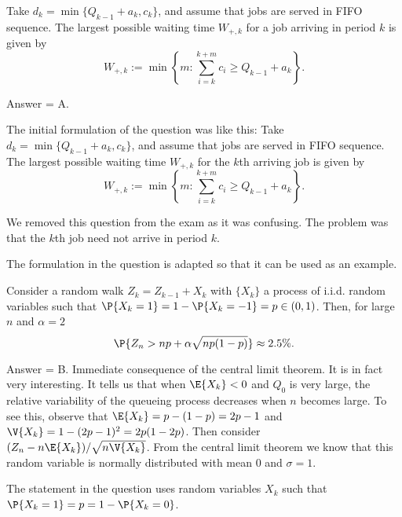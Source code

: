 \begin{exercise}[201902]
Take $d_k = \min\{Q_{k-1}+a_k, c_k\}$, and assume that jobs are served in
 FIFO sequence. The largest possible waiting time $W_{+, k}$ for a job arriving in period $k$ is given by 
 \begin{equation*}
 W_{+,k}:= \min\left\{m: \sum_{i=k}^{k+m} c_i \geq
 Q_{k-1}+a_k\right\}.
 \end{equation*}

\begin{solution}
Answer = A.



The initial formulation of the question was like this: Take $d_k = \min\{Q_{k-1}+a_k, c_k\}$, and assume that jobs are served in
 FIFO sequence. The largest possible waiting time $W_{+, k}$ for the $k$th arriving job is given by 
 \begin{equation*}
 W_{+,k}:= \min\left\{m: \sum_{i=k}^{k+m} c_i \geq
 Q_{k-1}+a_k\right\}.
 \end{equation*}

 We removed this question from the exam as it was confusing. The problem was that the $k$th job need not arrive in period $k$.

 The formulation in the question is adapted so that it can be used as an example. 

\end{solution}
\end{exercise}

\begin{exercise}[201902]
 Consider a random walk $Z_k = Z_{k-1} + X_k$ with $\{X_k\}$ a process of i.i.d. random variables such that $\P{X_k=1} = 1-\P{X_k=-1} = p \in (0, 1)$. Then, for large $n$ and $\alpha = 2$
 \begin{equation*}
 \P{Z_n > np + \alpha \sqrt{np(1-p)}} \approx 2.5\%.
 \end{equation*}


\begin{solution}
Answer = B. Immediate consequence of the central limit theorem. It is in fact very interesting. It tells us that when $\E{X_k} < 0$ and $Q_0$ is very large, the relative variability of the queueing process decreases when $n$ becomes large. To see this, observe that $\E{X_k} = p - (1-p)=2p-1$ and $\V{X_k} = 1 - (2p-1)^2 = 2p(1-2p)$. Then consider $(Z_n - n\E{X_k})/\sqrt{n\V{X_k}}$. From the central limit theorem we know that this random variable is normally distributed with mean 0 and $\sigma=1$. 

The statement in the question uses random variables $X_k$ such that $\P{X_k=1}=p = 1- \P{X_k=0}$. 
\end{solution}
\end{exercise}

